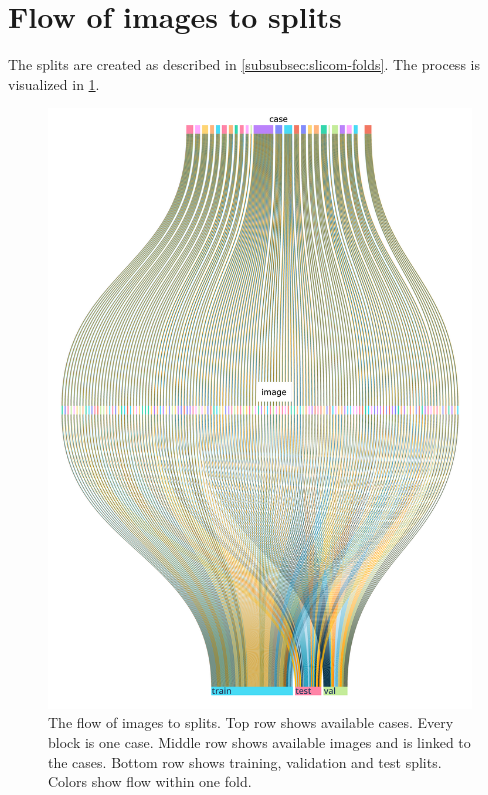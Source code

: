 \section{Flow of images to splits}\label{app:folds-splits-viz}
The splits are created as described in \cref{subsubsec:slicom-folds}.
The process is visualized in \cref{fig:folds-splits-viz}.

\begin{figure}
    \centering
    \includegraphics[height=0.55\paperheight]{pediatric-brain-tumours/images/folds-splits-viz.pdf}
    \caption[Flow of images to splits]{
        The flow of images to splits.
        Top row shows available cases.
        Every block is one case.
        Middle row shows available images and is linked to the cases.
        Bottom row shows training, validation and test splits.
        Colors show flow within one fold.
    }
    \label{fig:folds-splits-viz}
\end{figure}
